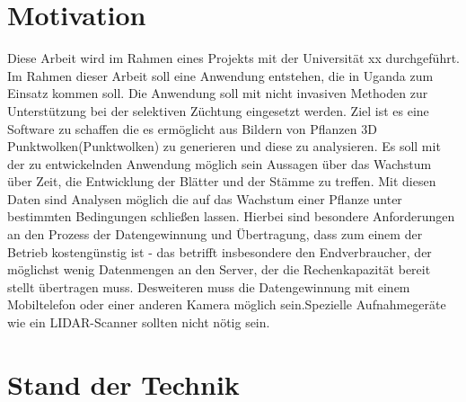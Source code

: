 \documentclass[12pt,titlepage, twoside]{article}
\begin{document}
\newpage

\pagestyle{plain}
\tableofcontents
\newpage

\renewcommand{\labelenumi}{\alph{enumi})} 



\section{Motivation}
\label{sec:einleitung}
Diese Arbeit wird im Rahmen eines Projekts mit der Universität xx durchgeführt. Im Rahmen dieser Arbeit soll eine Anwendung entstehen, die in Uganda zum Einsatz kommen soll.
Die Anwendung soll mit nicht invasiven Methoden zur Unterstützung bei der selektiven Züchtung eingesetzt werden.
Ziel ist es eine Software zu schaffen die es ermöglicht aus Bildern von Pflanzen 3D Punktwolken(Punktwolken) zu generieren und diese zu analysieren.
Es soll mit der zu entwickelnden Anwendung möglich sein Aussagen über das Wachstum über Zeit, die Entwicklung der Blätter und der Stämme zu treffen. 
Mit diesen Daten sind Analysen möglich die auf das Wachstum einer Pflanze unter bestimmten Bedingungen schließen lassen.
Hierbei sind besondere Anforderungen an den Prozess der Datengewinnung und Übertragung, dass zum einem der Betrieb kostengünstig ist - das betrifft insbesondere den Endverbraucher, der möglichst wenig Datenmengen an den Server, der die Rechenkapazität bereit stellt übertragen muss.
Desweiteren muss die Datengewinnung mit einem Mobiltelefon oder einer anderen Kamera möglich sein.Spezielle Aufnahmegeräte wie ein LIDAR-Scanner sollten nicht nötig sein.


\newpage
\section{Stand der Technik}
\label{sec:stand}
%
\end{document}

